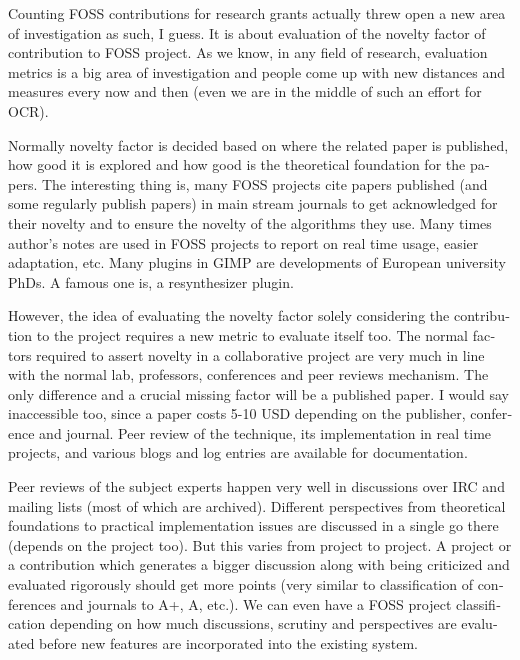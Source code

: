 \vskip 2pt
\begin{english}
Counting FOSS contributions for research grants actually threw open
a new area of investigation as such, I guess. It is about evaluation of the novelty
factor of contribution to FOSS project. As we know, in any field of research,
evaluation metrics is a big area of investigation and people come up with new
distances and measures every now and then (even we are in the middle of
such an effort for OCR). 

Normally novelty factor is decided based on where
the related paper is published, how good it is explored and how good is the
theoretical foundation for the papers. The interesting thing is, many FOSS
projects cite papers published (and some regularly publish papers) in main
stream journals to get acknowledged for their novelty and to ensure the novelty of
the algorithms they use. Many times author's notes are used in FOSS projects to
report on real time usage, easier adaptation, etc. Many plugins in GIMP are
developments of European university PhDs. A famous one is, a resynthesizer plugin.

However, the idea of evaluating the novelty factor solely considering the contribution
to the project requires a new metric to evaluate itself too. The normal factors
required to assert novelty in a collaborative project are very
much in line with the normal lab, professors, conferences and peer reviews mechanism.
The only difference and a crucial missing factor will be a published paper. I would
say inaccessible too, since a paper costs 5-10 USD depending on the publisher,
conference and journal. Peer review of the technique,
its implementation in real time projects, and various blogs and log entries are
available for documentation.

Peer reviews of the subject experts happen very well in discussions
over IRC and mailing lists (most of which are archived). Different perspectives
from theoretical foundations to practical implementation issues are discussed
in a single go there (depends on the project too). But this varies from project
to project. A project or a contribution which generates a bigger discussion
along with being criticized and evaluated rigorously should get more points (very similar
to classification of conferences and journals to A+, A, etc.).  We can even
have a FOSS project classification depending on how much discussions, scrutiny
and perspectives are evaluated before new features are incorporated into the
existing system.


\end{english}
